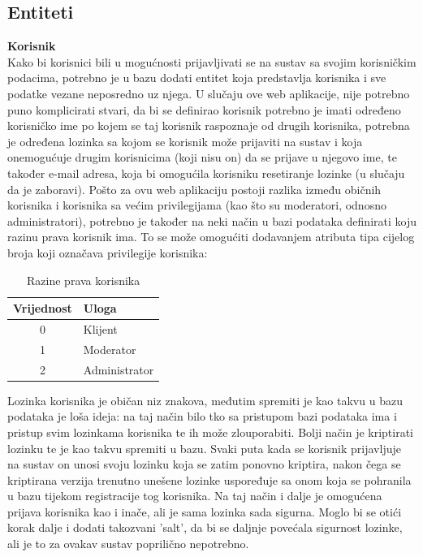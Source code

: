\documentclass[times, utf8, zavrsni]{fer}
\begin{document}
\subsection{Entiteti}
\textbf{Korisnik}\\
Kako bi korisnici bili u mogućnosti prijavljivati se na sustav sa svojim korisničkim podacima, potrebno je u bazu dodati entitet koja predstavlja korisnika i sve podatke vezane neposredno uz njega. U slučaju ove web aplikacije, nije potrebno puno komplicirati stvari, da bi se definirao korisnik potrebno je imati određeno korisničko ime po kojem se taj korisnik raspoznaje od drugih korisnika, potrebna je određena lozinka sa kojom se korisnik može prijaviti na sustav i koja onemogućuje drugim korisnicima (koji nisu on) da se prijave u njegovo ime, te također e-mail adresa, koja bi omogućila korisniku resetiranje lozinke (u slučaju da je zaboravi). Pošto za ovu web aplikaciju postoji razlika između običnih korisnika i korisnika sa većim privilegijama (kao što su moderatori, odnosno administratori), potrebno je također na neki način u bazi podataka definirati koju razinu prava korisnik ima. To se može omogućiti dodavanjem atributa tipa cijelog broja koji označava privilegije korisnika:

\begin{table}[H]
\caption{Razine prava korisnika}
\label{tbl:razine_prava}
\centering
\begin{tabular}{cl}
\hline
Vrijednost & Uloga\\
\hline
0 & Klijent \\
1 & Moderator \\
2 & Administrator \\ 
\hline
\end{tabular}
\end{table}

Lozinka korisnika je običan niz znakova, međutim spremiti je kao takvu u bazu podataka je loša ideja: na taj način bilo tko sa pristupom bazi podataka ima i pristup svim lozinkama korisnika te ih može zlouporabiti. Bolji način je kriptirati lozinku te je kao takvu spremiti u bazu. Svaki puta kada se korisnik prijavljuje na sustav on unosi svoju lozinku koja se zatim ponovno kriptira, nakon čega se kriptirana verzija trenutno unešene lozinke uspoređuje sa onom koja se pohranila u bazu tijekom registracije tog korisnika. Na taj način i dalje je omogućena prijava korisnika kao i inače, ali je sama lozinka sada sigurna. Moglo bi se otići korak dalje i dodati takozvani 'salt', da bi se daljnje povećala sigurnost lozinke, ali je to za ovakav sustav poprilično nepotrebno.
\end{document}
